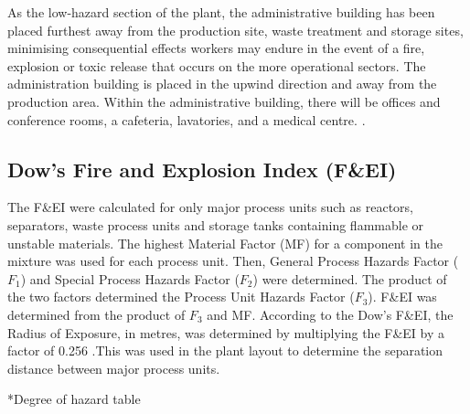 As the low-hazard section of the plant, the administrative building has been placed furthest away from the production site, waste treatment and storage sites, minimising  consequential effects workers may endure in the event of a fire, explosion or toxic release that occurs on the more operational sectors. The administration building is placed in the upwind direction and away from the production area. Within the administrative building, there will be offices and conference rooms, a cafeteria, lavatories, and a medical centre. \cite{sinnott_coulson_2005}. 

\subsection{Dow's Fire and Explosion Index (F\&EI)}
The F\&EI were calculated for only major process units such as reactors, separators, waste process units and storage tanks containing flammable or unstable materials. The highest Material Factor (MF) for a component in the mixture was used for each process unit. Then, General Process Hazards Factor ($F_1$) and Special Process Hazards Factor ($F_2$) were determined. The product of the two factors determined the Process Unit Hazards Factor ($F_3$). F\&EI was determined from the product of $F_3$ and MF. According to the Dow's F\&EI, the Radius of Exposure, in metres, was determined by multiplying the F\&EI by a factor of 0.256 \cite{aiche_dows_1994}.This was used in the plant layout to determine the separation distance between major process units.    

*Degree of hazard table

